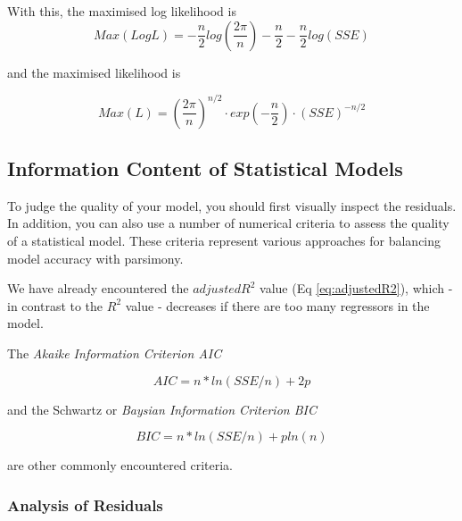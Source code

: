 With this, the maximised log likelihood is
\begin{equation}
  Max(Log L) = -\frac{n}{2} log \left(\frac{2 \pi}{n} \right) - \frac{n}{2} - \frac{n}{2} log(SSE)
\end{equation}

and the maximised likelihood is

\begin{equation}
  Max(L) = \left( \frac{2 \pi}{n} \right)^{n/2} \cdot exp(- \frac{n}{2}) \cdot (SSE)^{-n/2}
\end{equation}

\subsection{Information Content of Statistical Models}

To judge the quality of your model, you should first visually inspect the residuals. In addition, you can also use a number of numerical criteria to assess the quality of a statistical model. These criteria represent various approaches for balancing model accuracy with parsimony.

We have already encountered the $adjusted R^2$ value (Eq \ref{eq:adjustedR2}), which - in contrast to the $R^2$ value - decreases if there are too many regressors in the model.

The \emph{Akaike Information Criterion AIC} 

\begin{equation}
  AIC = n * ln(SSE / n) + 2p
\end{equation}

and the Schwartz or \emph{Baysian Information Criterion BIC} 

\begin{equation}
  BIC = n * ln(SSE/n) + p ln(n)
\end{equation}

are other commonly encountered criteria.

\subsubsection{Analysis of Residuals}

